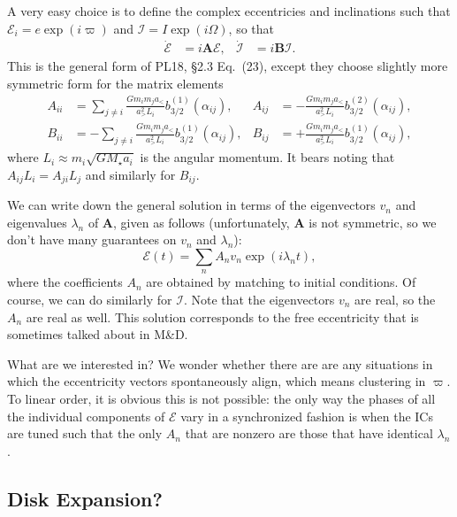 \documentclass[11pt,
        usenames, %
        dvipsnames %
    ]{article}
\newcommand*{\bm}[1]{\boldsymbol{\mathbf{#1}}}
\newcommand*{\p}[1]{\left(#1\right)}
\begin{document}
A very easy choice is to define the complex eccentricies and inclinations such
that $\mathcal{E}_i = e \exp\p{i\varpi}$ and $\mathcal{I} = I\exp\p{i\Omega}$,
so that
\begin{align}
    \dot{\mathcal{E}} &= i\bm{A}\mathcal{E}, &
    \dot{\mathcal{I}} &= i\bm{B} \mathcal{I}.
\end{align}
This is the general form of PL18, \S2.3 Eq.~(23), except they choose slightly
more symmetric form for the matrix elements
\begin{align}
    A_{ii} &= \sum\limits_{j \neq i} \frac{Gm_im_ja_<}{a_>^2 L_i}
        b_{3/2}^{(1)}(\alpha_{ij}),&
    A_{ij} &= -\frac{Gm_im_ja_<}{a_>^2 L_i}
        b_{3/2}^{(2)}(\alpha_{ij}),\\
    B_{ii} &= -\sum\limits_{j \neq i} \frac{Gm_im_ja_<}{a_>^2 L_i}
        b_{3/2}^{(1)}(\alpha_{ij}),&
    B_{ij} &= +\frac{Gm_im_ja_<}{a_>^2 L_i}
        b_{3/2}^{(1)}(\alpha_{ij}),
\end{align}
where $L_i \approx m_i\sqrt{GM_\star a_i}$ is the angular momentum. It bears
noting that $A_{ij}L_i = A_{ji}L_j$ and similarly for $B_{ij}$.

We can write down the general solution in terms of the eigenvectors $v_n$ and
eigenvalues $\lambda_n$ of $\bm{A}$, given as follows (unfortunately, $\bm{A}$
is not symmetric, so we don't have many guarantees on $v_n$ and $\lambda_n$):
\begin{equation}
    \mathcal{E}(t) = \sum\limits_{n} A_n v_n \exp\p{i\lambda_n t},
\end{equation}
where the coefficients $A_n$ are obtained by matching to initial conditions. Of
course, we can do similarly for $\mathcal{I}$. Note that the eigenvectors $v_n$
are real, so the $A_n$ are real as well. This solution corresponds to the free
eccentricity that is sometimes talked about in M\&D.

What are we interested in? We wonder whether there are are any situations in
which the eccentricity vectors spontaneously align, which means clustering in
$\varpi$. To linear order, it is obvious this is not possible: the only way the
phases of all the individual components of $\mathcal{E}$ vary in a synchronized
fashion is when the ICs are tuned such that the only $A_n$ that are nonzero are
those that have identical $\lambda_n$.

\subsection{Disk Expansion?}
\end{document}
